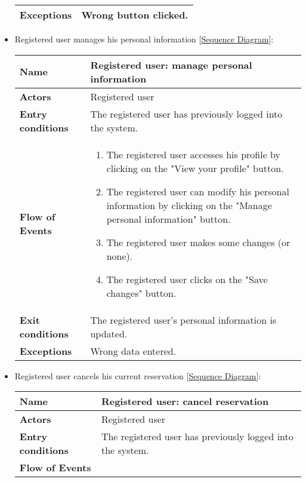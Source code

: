 \begin{itemize}
\begin{table}[H]
\begin{tabular}{| m{3.5cm} | m{9.5cm} |}
			\hline
			\textbf{Exceptions} & Wrong button clicked. \\
			\hline
		\end{tabular}
	\end{table}
\item Registered user manages his personal information [\hyperlink{ManageInfo}{Sequence Diagram}]:
\begin{table}[H]
	\centering
	\begin{tabular}{| m{3.5cm} | m{9.5cm} |}
		\hline
		\textbf{Name} & Registered user: manage personal information\\
		\hline
		\textbf{Actors} & Registered user\\
		\hline
		\textbf{Entry conditions} & The registered user has previously logged into the system.\\
		\hline
		\textbf{Flow of Events} & 
		\begin{enumerate}
			\item The registered user accesses his profile by clicking on the "View your profile" button.
			\item The registered user can modify his personal information by clicking on the "Manage personal information" button.
			\item The registered user makes some changes (or none).
			\item The registered user clicks on the "Save changes" button.  
		\end{enumerate} \\
		\hline
		\textbf{Exit conditions} & The registered user's personal information is updated.\\
		\hline
		\textbf{Exceptions} & Wrong data entered. \\
		\hline
	\end{tabular}
\end{table}
\newpage
\item Registered user cancels his current reservation [\hyperlink{CancelRes}{Sequence Diagram}]:
\begin{table}[H]
	\centering
	\begin{tabular}{| m{3.5cm} | m{9.5cm} |}
		\hline
		\textbf{Name} & Registered user: cancel reservation\\
		\hline
		\textbf{Actors} & Registered user\\
		\hline
		\textbf{Entry conditions} & The registered user has previously logged into the system.\\
		\hline
		\textbf{Flow of Events} & 
		\begin{enumerate}

\end{enumerate}
\end{tabular}
\end{table}
\end{itemize}

